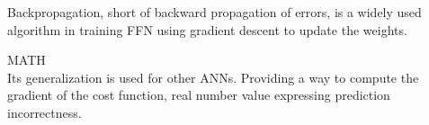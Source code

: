 Backpropagation, short of backward propagation of errors, is a widely used algorithm in
 training FFN using gradient descent to update the weights. \cite{birlliantbackprop}\newline

MATH \\

Its generalization is used for other ANNs. Providing a way to compute the gradient of the cost function,
 real number value expressing prediction incorrectness.\cite{Goodfellow-et-al-2016}
